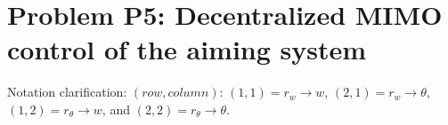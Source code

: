 \documentclass{tron}
\begin{document}
\maketitle
 \tableofcontents
\clearpage
{}
\setcounter{page}{1}
\setlength{\parskip}{5pt}
\newpage


\section{Problem P5: Decentralized MIMO control of the aiming system}
Notation clarification: $(row, column)$: $(1,1)=r_w \rightarrow w$, $(2,1)=r_w \rightarrow \theta$, $(1,2)=r_{\theta} \rightarrow w$, and $(2,2)=r_{\theta} \rightarrow \theta$.
\end{document}
